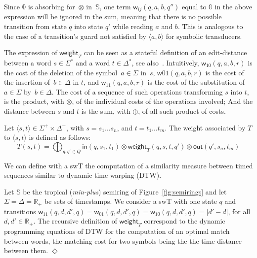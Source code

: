 \documentclass[runningheads]{llncs}
\def\endex{\hspace*{\fill} $\Diamond$\smallskip }
{\theorembodyfont{\rmfamily} \theoremstyle{break} \newtheorem{algo}{Algorithm}}
\def\<#1>{\langle #1 \rangle}
\newcommand{\Semiring}{\mathbb{S}}
\newcommand{\zero}{\mathbb{0}}
\def\SWT{\textsf{swT}\xspace}
\def\weight{\mathsf{weight}}
\def\wei{\mathsf{w}}
\begin{document}
Since $\zero$ is absorbing for~$\otimes$ in~$\Semiring$,
one term $\wei_{ij}(q, a, b, q'')$ equal to $\zero$ in the above expression 
will be ignored in the sum, meaning that there is no possible transition
from state $q$ into state $q'$ while reading $a$ and $b$.
This is analogous to the case of a transition's guard not satisfied by $\<a, b>$ for 
symbolic transducers.

%

The expression of $\weight_T$ can be seen as a stateful definition of 
an edit-distance between a word $s \in \Sigma^*$ and a word $t \in \Delta^*$,
see also~\cite{Mohri03ijfcs}.
Intuitively, 
$\wei_{10}(q, a, b, r)$ is the cost of 
the deletion of the symbol~$a \in \Sigma$ in~$s$, 
$\wei{01}(q, a, b, r)$ is the cost 
of the insertion of~$b \in \Delta$ in $t$, 
and $\wei_{11}(q, a, b, r)$ is the cost 
of the substitution of  $a \in \Sigma$ by~$b \in \Delta$.
%
The cost of a sequence of such operations transforming $s$ into $t$, 
is the product, with $\otimes$, of the individual costs of the operations involved;
And the distance between $s$ and $t$ is the sum, with $\oplus$,
of all such product of costs.

\medskip\noindent
Let $\< s, t> \in \Sigma^+ \times \Delta^+$, with $s = s_1\ldots s_n$, 
and $t = t_1\ldots t_m$. 
The weight associated by $T$ to $\< s, t>$
is defined as follows:
\begin{equation}
T(s, t)  = 
\displaystyle\bigoplus_{q, q' \in Q} \mathsf{in}(q, s_1, t_1) 
\mathop{\otimes} \weight_T(q, s, t, q') \mathop{\otimes} \mathsf{out}(q', s_n, t_m)
\label{eq:SWT-value}
\end{equation}

\begin{example}
We can define with a \SWT the computation of a similarity measure 
between timed sequences
similar to dynamic time warping (DTW).

Let $\Semiring$  be the tropical (\emph{min-plus}) semiring of Figure~\ref{fig:semirings} and 
let $\Sigma = \Delta = \mathbb{R}_+$ be sets of timestamps.
We consider a \SWT with one state $q$ and transitions
$\wei_{11}(q, d, d', q) = 
 \wei_{01}(q, d, d', q) = 
 \wei_{10}(q, d, d', q) = |d' - d|$,
for all $d, d' \in \mathbb{R}_+$.
The recursive definition of $\weight_T$ correspond to the dynamic programming equations of DTW
for the computation of an optimal match between words, 
the matching cost for two symbols being the 
the time distance between them.
\endex
\end{example}
\end{document}
